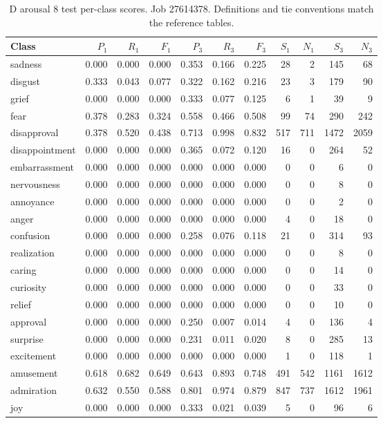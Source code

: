 \begin{table}[!htbp]
\centering
\scriptsize
\setlength{\tabcolsep}{5pt}
\begin{tabular}{lrrrrrrrrrr}
\toprule
Class & $P_1$ & $R_1$ & $F_1$ & $P_3$ & $R_3$ & $F_3$ & $S_1$ & $N_1$ & $S_3$ & $N_3$ \\
\midrule
sadness & 0.000 & 0.000 & 0.000 & 0.353 & 0.166 & 0.225 & 28 & 2 & 145 & 68 \\
disgust & 0.333 & 0.043 & 0.077 & 0.322 & 0.162 & 0.216 & 23 & 3 & 179 & 90 \\
grief & 0.000 & 0.000 & 0.000 & 0.333 & 0.077 & 0.125 & 6 & 1 & 39 & 9 \\
fear & 0.378 & 0.283 & 0.324 & 0.558 & 0.466 & 0.508 & 99 & 74 & 290 & 242 \\
disapproval & 0.378 & 0.520 & 0.438 & 0.713 & 0.998 & 0.832 & 517 & 711 & 1472 & 2059 \\
disappointment & 0.000 & 0.000 & 0.000 & 0.365 & 0.072 & 0.120 & 16 & 0 & 264 & 52 \\
embarrassment & 0.000 & 0.000 & 0.000 & 0.000 & 0.000 & 0.000 & 0 & 0 & 6 & 0 \\
nervousness & 0.000 & 0.000 & 0.000 & 0.000 & 0.000 & 0.000 & 0 & 0 & 8 & 0 \\
annoyance & 0.000 & 0.000 & 0.000 & 0.000 & 0.000 & 0.000 & 0 & 0 & 2 & 0 \\
anger & 0.000 & 0.000 & 0.000 & 0.000 & 0.000 & 0.000 & 4 & 0 & 18 & 0 \\
confusion & 0.000 & 0.000 & 0.000 & 0.258 & 0.076 & 0.118 & 21 & 0 & 314 & 93 \\
realization & 0.000 & 0.000 & 0.000 & 0.000 & 0.000 & 0.000 & 0 & 0 & 8 & 0 \\
caring & 0.000 & 0.000 & 0.000 & 0.000 & 0.000 & 0.000 & 0 & 0 & 14 & 0 \\
curiosity & 0.000 & 0.000 & 0.000 & 0.000 & 0.000 & 0.000 & 0 & 0 & 33 & 0 \\
relief & 0.000 & 0.000 & 0.000 & 0.000 & 0.000 & 0.000 & 0 & 0 & 10 & 0 \\
approval & 0.000 & 0.000 & 0.000 & 0.250 & 0.007 & 0.014 & 4 & 0 & 136 & 4 \\
surprise & 0.000 & 0.000 & 0.000 & 0.231 & 0.011 & 0.020 & 8 & 0 & 285 & 13 \\
excitement & 0.000 & 0.000 & 0.000 & 0.000 & 0.000 & 0.000 & 1 & 0 & 118 & 1 \\
amusement & 0.618 & 0.682 & 0.649 & 0.643 & 0.893 & 0.748 & 491 & 542 & 1161 & 1612 \\
admiration & 0.632 & 0.550 & 0.588 & 0.801 & 0.974 & 0.879 & 847 & 737 & 1612 & 1961 \\
joy & 0.000 & 0.000 & 0.000 & 0.333 & 0.021 & 0.039 & 5 & 0 & 96 & 6 \\
\bottomrule
\end{tabular}
\caption{D arousal 8 test per-class scores. Job 27614378. Definitions and tie conventions match the reference tables.}
\label{tab:classes-d_arousal_k8}
\end{table}
